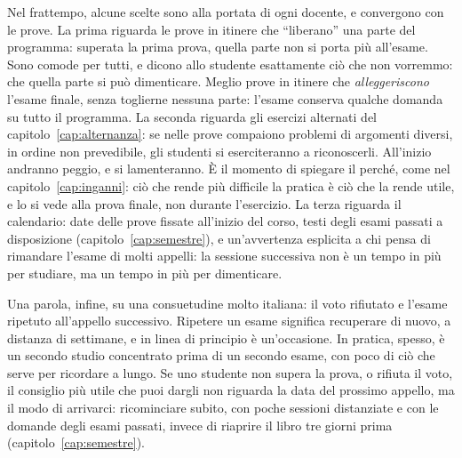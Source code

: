 Nel frattempo, alcune scelte sono alla portata di ogni docente, e
convergono con le prove. La prima riguarda le prove in itinere che
\enquote{liberano} una parte del programma: superata la prima prova,
quella parte non si porta più all'esame. Sono comode per tutti, e
dicono allo studente esattamente ciò che non vorremmo: che quella
parte si può dimenticare. Meglio prove in itinere che \emph{alleggeriscono}
l'esame finale, senza toglierne nessuna parte: l'esame conserva
qualche domanda su tutto il programma. La seconda riguarda gli
esercizi alternati del capitolo~\ref{cap:alternanza}: se nelle prove
compaiono problemi di argomenti diversi, in ordine non prevedibile,
gli studenti si eserciteranno a riconoscerli. All'inizio andranno
peggio, e si lamenteranno. È il momento di spiegare il perché, come
nel capitolo~\ref{cap:inganni}: ciò che rende più difficile la pratica
è ciò che la rende utile, e lo si vede alla prova finale, non durante
l'esercizio. La terza riguarda il calendario: date delle prove fissate
all'inizio del corso, testi degli esami passati a disposizione
(capitolo~\ref{cap:semestre}), e un'avvertenza esplicita a chi pensa
di rimandare l'esame di molti appelli: la sessione successiva non è un
tempo in più per studiare, ma un tempo in più per dimenticare.

Una parola, infine, su una consuetudine molto italiana: il voto
rifiutato e l'esame ripetuto all'appello successivo. Ripetere un
esame significa recuperare di nuovo, a distanza di settimane, e in
linea di principio è un'occasione. In pratica, spesso, è un secondo
studio concentrato prima di un secondo esame, con poco di ciò che
serve per ricordare a lungo. Se uno studente non supera la prova, o
rifiuta il voto, il consiglio più utile che puoi dargli non riguarda
la data del prossimo appello, ma il modo di arrivarci: ricominciare
subito, con poche sessioni distanziate e con le domande degli esami
passati, invece di riaprire il libro tre giorni prima
(capitolo~\ref{cap:semestre}).

